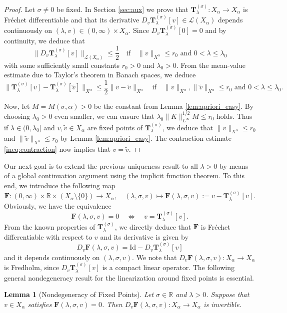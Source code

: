 \documentclass[reqno,10pt,a4paper]{amsart}
\newtheorem{lem}{Lemma}[section]
\theoremstyle{definition}
\theoremstyle{definition}
\theoremstyle{remark}
\theoremstyle{remark}
\numberwithin{equation}{section}
\newcommand{\R}{\mathbb{R}}
\newcommand{\be}{\begin{equation}}
\newcommand{\ee}{\end{equation}}
\newcommand{\id}{\mathrm{Id}}
\newcommand{\Tss}{\mathbf{T}^{(\sigma)}_\lambda}
\newcommand{\Fs}{\mathbf{F}}
\begin{document}
\begin{proof}
Let $\sigma \neq 0$ be fixed. In Section \ref{sec:aux} we prove that  $\Tss : X_\alpha \to X_\alpha$ is Fr\'echet differentiable and that its derivative $D_v \Tss[v] \in \mathcal{L}(X_\alpha)$ depends continuously on $(\lambda, v) \in (0,\infty) \times X_\alpha$. Since $D_v \Tss[0] = 0$ and by continuity, we deduce that
$$
\| D_v \Tss[v] \|_{\mathcal{L}(X_\alpha)} \leq \frac{1}{2} \quad \mbox{if} \quad  \mbox{$\| v \|_{X^\alpha} \leq r_0$ and $0 < \lambda \leq \lambda_0$}
$$
with some sufficiently small constants $r_0 > 0$ and $\lambda_0 > 0$.
From the mean-value estimate due to Taylor's theorem in Banach spaces, we deduce
\be \label{ineq:contraction}
\| \Tss[v] - \Tss[\tilde{v}] \|_{X^\alpha} \leq \frac{1}{2} \|v - \tilde{v} \|_{X^\alpha} \quad \mbox{if} \quad \mbox{$\| v \|_{X^\alpha}, \| \tilde{v} \|_{X^\alpha} \leq r_0$ and $0 < \lambda \leq \lambda_0$}.
\ee

Now, let $M=M(\sigma, \alpha) > 0$ be the constant from Lemma \ref{lem:apriori_easy}. By choosing $\lambda_0 > 0$ even smaller, we can ensure that $\lambda_0 \|K \|_{L^\infty}^{1/2} M \leq r_0$ holds. Thus if $\lambda \in (0, \lambda_0]$ and $v, \tilde{v} \in X_\alpha$ are fixed points of $\Tss$, we deduce that $\| v \|_{X^\alpha} \leq r_0$ and $\| \tilde{v} \|_{X^\alpha} \leq r_0$ by Lemma \ref{lem:apriori_easy}. The contraction estimate \eqref{ineq:contraction} now implies that $v = \tilde{v}$.
\end{proof}

Our next goal is to extend the previous uniqueness result to all $\lambda > 0$ by means of a global continuation argument using the implicit function theorem. To this end, we introduce the following map
$$
\Fs : (0,\infty) \times \R \times (X_\alpha \setminus \{ 0 \}) \to X_\alpha, \quad (\lambda, \sigma, v) \mapsto \Fs(\lambda, \sigma, v) := v - \Tss[v].
$$
Obviously, we have the equivalence
$$
\Fs(\lambda, \sigma, v)=0 \quad \Longleftrightarrow \quad v= \Tss[v].
$$
From the known properties of $\Tss$, we directly deduce that $\Fs$ is Fr\'echet differentiable with respect to $v$ and its derivative is given by
$$
D_v \Fs(\lambda, \sigma, v) = \id - D_v \Tss[v]
$$
and it depends continuously on $(\lambda, \sigma, v)$. We note that $D_v \Fs(\lambda, \sigma, v) : X_\alpha \to X_\alpha$ is Fredholm, since $D_v \Tss[v]$ is a compact linear operator. The following general nondegeneracy result for the linearization around fixed points is essential.

\begin{lem}[Nondegeneracy of Fixed Points] \label{lem:nondeg}
Let $\sigma \in \R$ and $\lambda > 0$. Suppose that $v \in X_\alpha$ satisfies $\Fs(\lambda, \sigma, v) = 0$. Then $D_v \Fs(\lambda, \sigma, v) : X_\alpha \to X_\alpha$ is invertible. 
\end{lem}
\end{document}
